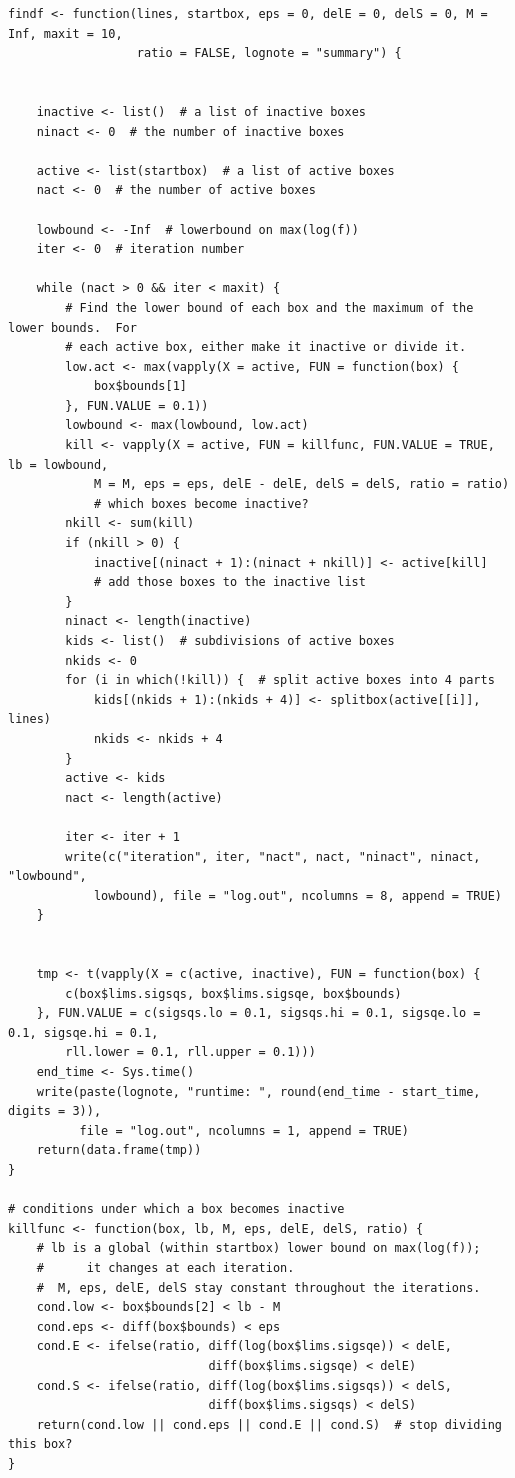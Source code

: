 \documentclass{report}
\begin{document}
\begin{verbatim}
findf <- function(lines, startbox, eps = 0, delE = 0, delS = 0, M = Inf, maxit = 10,
                  ratio = FALSE, lognote = "summary") {


    inactive <- list()  # a list of inactive boxes
    ninact <- 0  # the number of inactive boxes
    
    active <- list(startbox)  # a list of active boxes
    nact <- 0  # the number of active boxes

    lowbound <- -Inf  # lowerbound on max(log(f))
    iter <- 0  # iteration number

    while (nact > 0 && iter < maxit) {
        # Find the lower bound of each box and the maximum of the lower bounds.  For
        # each active box, either make it inactive or divide it.
        low.act <- max(vapply(X = active, FUN = function(box) {
            box$bounds[1]
        }, FUN.VALUE = 0.1))
        lowbound <- max(lowbound, low.act)
        kill <- vapply(X = active, FUN = killfunc, FUN.VALUE = TRUE, lb = lowbound,
            M = M, eps = eps, delE - delE, delS = delS, ratio = ratio)
            # which boxes become inactive?
        nkill <- sum(kill)
        if (nkill > 0) {
            inactive[(ninact + 1):(ninact + nkill)] <- active[kill] 
            # add those boxes to the inactive list
        }
        ninact <- length(inactive)
        kids <- list()  # subdivisions of active boxes
        nkids <- 0
        for (i in which(!kill)) {  # split active boxes into 4 parts
            kids[(nkids + 1):(nkids + 4)] <- splitbox(active[[i]], lines)
            nkids <- nkids + 4
        }
        active <- kids
        nact <- length(active)

        iter <- iter + 1
        write(c("iteration", iter, "nact", nact, "ninact", ninact, "lowbound",
            lowbound), file = "log.out", ncolumns = 8, append = TRUE)
    }


    tmp <- t(vapply(X = c(active, inactive), FUN = function(box) {
        c(box$lims.sigsqs, box$lims.sigsqe, box$bounds)
    }, FUN.VALUE = c(sigsqs.lo = 0.1, sigsqs.hi = 0.1, sigsqe.lo = 0.1, sigsqe.hi = 0.1,
        rll.lower = 0.1, rll.upper = 0.1)))
    end_time <- Sys.time()
    write(paste(lognote, "runtime: ", round(end_time - start_time, digits = 3)),
          file = "log.out", ncolumns = 1, append = TRUE)
    return(data.frame(tmp))
}

# conditions under which a box becomes inactive
killfunc <- function(box, lb, M, eps, delE, delS, ratio) {
    # lb is a global (within startbox) lower bound on max(log(f));
    #      it changes at each iteration.
    #  M, eps, delE, delS stay constant throughout the iterations.
    cond.low <- box$bounds[2] < lb - M
    cond.eps <- diff(box$bounds) < eps
    cond.E <- ifelse(ratio, diff(log(box$lims.sigsqe)) < delE,
                            diff(box$lims.sigsqe) < delE)
    cond.S <- ifelse(ratio, diff(log(box$lims.sigsqs)) < delS,
                            diff(box$lims.sigsqs) < delS)
    return(cond.low || cond.eps || cond.E || cond.S)  # stop dividing this box?
}
\end{verbatim}
\end{document}
